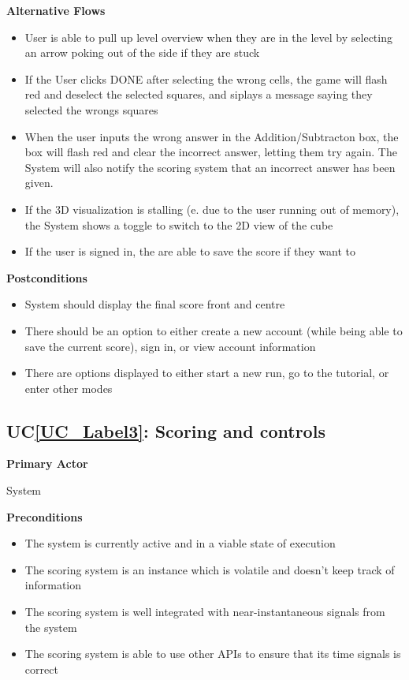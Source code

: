 \documentclass[12pt]{article}
\newcounter{ucnum} %
\newcommand{\ucref}[1]{UC\ref{#1}}
\begin{document}
\textbf{Alternative Flows}
\begin{itemize}
\item User is able to pull up level overview when they are in the level by selecting an arrow poking out of the side if they are stuck
\item If the User clicks DONE after selecting the wrong cells, the game will flash red and deselect the selected squares, and siplays a message saying they selected the wrongs squares
\item When the user inputs the wrong answer in the Addition/Subtracton box, the box will flash red and clear the incorrect answer, letting them try again. The System will also notify the scoring system that an incorrect answer has been given. 
\item If the 3D visualization is stalling (e. due to the user running out of memory), the System shows a toggle to switch to the 2D view of the cube
\item If the user is signed in, the are able to save the score if they want to
\end{itemize}

\textbf{Postconditions}
\begin{itemize}
\item System should display the final score front and centre
\item There should be an option to either create a new account (while being able to save the current score), sign in, or view account information 
\item There are options displayed to either start a new run, go to the tutorial, or enter other modes
\end{itemize}


 \label{UC_Label3}
\subsection{\ucref{UC_Label3}: Scoring and controls}

\textbf{Primary Actor}

System

\textbf{Preconditions}
\begin{itemize}
\item The system is currently active and in a viable state of execution
\item The scoring system is an instance which is volatile and doesn't keep track of information
\item The scoring system is well integrated with near-instantaneous signals from the system
\item The scoring system is able to use other APIs to ensure that its time signals is correct
\end{itemize}
\end{document}
